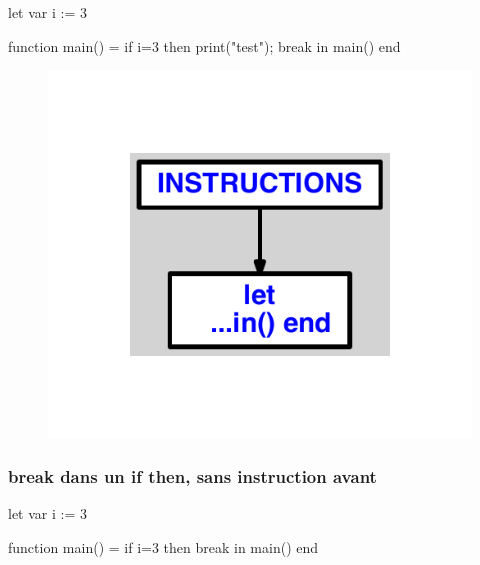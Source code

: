 \documentclass{article}
\begin{document}
\begin{verbatimtab}
let
	var i := 3

	function main() =
		if i=3 then
			print("test");
			break
in main() end
\end{verbatimtab}
\begin{figure}[H]\centering\includegraphics[max width=\textwidth]{ast/ast_16.pdf}\end{figure}\subsubsection{break dans un if then, sans instruction avant}
\begin{verbatimtab}
let
	var i := 3

	function main() =
		if i=3 then
			break
in main() end
\end{verbatimtab}
\end{document}
